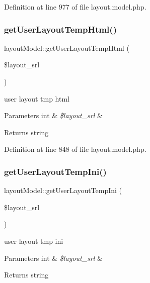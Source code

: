 Definition at line 977 of file layout.\+model.\+php.

\hypertarget{classlayoutModel_a19aaacba7d0b1c9bb466534933595381}{}\label{classlayoutModel_a19aaacba7d0b1c9bb466534933595381} 
\subsubsection{\texorpdfstring{get\+User\+Layout\+Temp\+Html()}{getUserLayoutTempHtml()}}
{\footnotesize\ttfamily layout\+Model\+::get\+User\+Layout\+Temp\+Html (\begin{DoxyParamCaption}\item[{}]{\$layout\+\_\+srl }\end{DoxyParamCaption})}

user layout tmp html 
\begin{DoxyParams}[1]{Parameters}
int & {\em \$layout\+\_\+srl} & \\
\hline
\end{DoxyParams}
\begin{DoxyReturn}{Returns}
string 
\end{DoxyReturn}


Definition at line 848 of file layout.\+model.\+php.

\hypertarget{classlayoutModel_a0de830b5db7303b6909568dfdfad2ac3}{}\label{classlayoutModel_a0de830b5db7303b6909568dfdfad2ac3} 
\subsubsection{\texorpdfstring{get\+User\+Layout\+Temp\+Ini()}{getUserLayoutTempIni()}}
{\footnotesize\ttfamily layout\+Model\+::get\+User\+Layout\+Temp\+Ini (\begin{DoxyParamCaption}\item[{}]{\$layout\+\_\+srl }\end{DoxyParamCaption})}

user layout tmp ini 
\begin{DoxyParams}[1]{Parameters}
int & {\em \$layout\+\_\+srl} & \\
\hline
\end{DoxyParams}
\begin{DoxyReturn}{Returns}
string 
\end{DoxyReturn}


